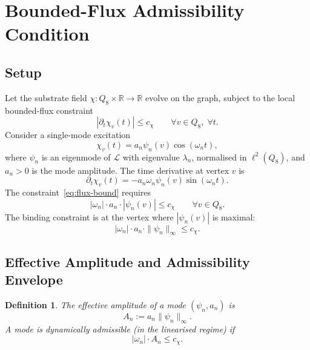 \documentclass[11pt,a4paper]{article}
\newtheorem{definition}{Definition}
\begin{document}
  \section{Bounded-Flux Admissibility Condition}

  \subsection{Setup}

    Let the substrate field $\chi \colon Q_8 \times \mathbb{R} \to \mathbb{R}$ evolve on the
    graph, subject to the local bounded-flux constraint
    \begin{equation}
      \label{eq:flux-bound}
      |\partial_t \chi_v(t)| \leq c_\chi \qquad \forall v \in Q_8, \; \forall t.
    \end{equation}
    Consider a single-mode excitation
    \begin{equation}
      \chi_v(t) = a_n \psi_n(v) \cos(\omega_n t),
    \end{equation}
    where $\psi_n$ is an eigenmode of $\mathcal{L}$ with eigenvalue $\lambda_n$,
    normalised in $\ell^2(Q_8)$, and $a_n > 0$ is the mode amplitude.
    The time derivative at vertex $v$ is
    \begin{equation}
      \partial_t \chi_v(t) = -a_n \omega_n \psi_n(v) \sin(\omega_n t).
    \end{equation}
    The constraint~\eqref{eq:flux-bound} requires
    \begin{equation}
      |\omega_n| \cdot a_n \cdot |\psi_n(v)| \leq c_\chi
      \qquad \forall v \in Q_8.
    \end{equation}
    The binding constraint is at the vertex where $|\psi_n(v)|$ is maximal:
    \begin{equation}
      |\omega_n| \cdot a_n \cdot \|\psi_n\|_\infty \leq c_\chi.
    \end{equation}

  \subsection{Effective Amplitude and Admissibility Envelope}

    \begin{definition}
      The \emph{effective amplitude} of a mode $(\psi_n, a_n)$ is
      \begin{equation}
        A_n := a_n \|\psi_n\|_\infty.
      \end{equation}
      A mode is \emph{dynamically admissible} (in the linearised regime) if
      \begin{equation}
        \label{eq:admissibility}
        |\omega_n| \cdot A_n \leq c_\chi.
      \end{equation}
    \end{definition}
\end{document}
